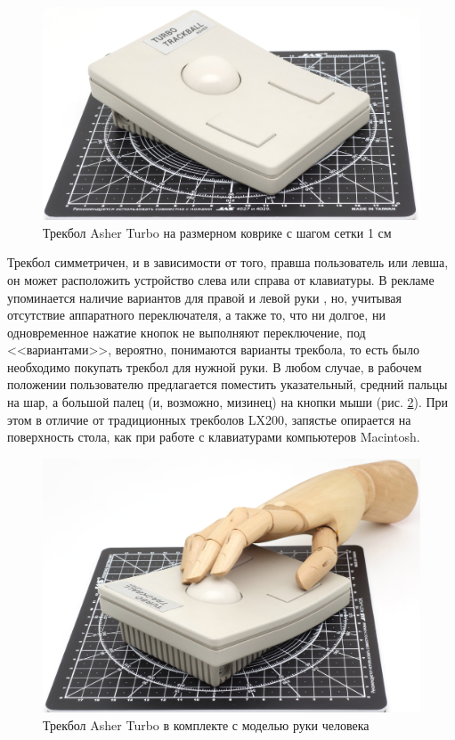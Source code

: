 \documentclass[11pt, a4paper]{article}
\begin{document}
\begin{figure}[h]
    \centering
    \includegraphics[scale=0.58]{1988_asher_turbo_trackball/size_30.jpg}
    \caption{Трекбол Asher Turbo на размерном коврике с шагом сетки 1 см}
    \label{fig:AsherSize}
\end{figure}

Трекбол симметричен, и в зависимости от того, правша пользователь или левша, он может расположить устройство слева или справа от клавиатуры. В рекламе упоминается наличие вариантов для правой и левой руки \cite{turbo}, но, учитывая отсутствие аппаратного переключателя, а также то, что ни долгое, ни одновременное нажатие кнопок не выполняют переключение, под <<вариантами>>, вероятно, понимаются варианты трекбола, то есть было необходимо покупать трекбол для нужной руки. В любом случае, в рабочем положении пользователю предлагается поместить указательный, средний пальцы на шар, а большой палец (и, возможно, мизинец) на кнопки мыши (рис. \ref{fig:AsherHand}). При этом в отличие от традиционных трекболов LX200, запястье опирается на поверхность стола, как при работе с клавиатурами компьютеров Macintosh.

\begin{figure}[h]
    \centering
    \includegraphics[scale=0.5]{1988_asher_turbo_trackball/hand_30.jpg}
    \caption{Трекбол Asher Turbo в комплекте с моделью руки человека}
    \label{fig:AsherHand}
\end{figure}
\end{document}
